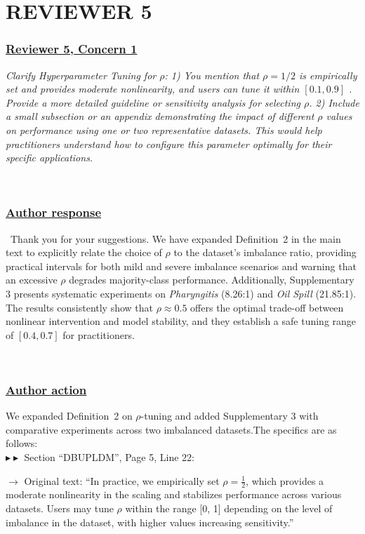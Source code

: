 \documentclass[journal,12pn, onecolumn]{IEEEtran}
\begin{document}
{{{{{{\newpage

{\color{black}
\section*{\textbf{REVIEWER 5}}\label{rev5}}
\textcolor{customgreen}{
\subsubsection*{\underline{\textbf{Reviewer 5, Concern 1}}}
\emph{Clarify Hyperparameter Tuning for $\rho$:
1) You mention that $\rho = 1/2$ is empirically set and provides moderate nonlinearity, and users can tune it within $[0.1, 0.9]$ . Provide a more detailed guideline or sensitivity analysis for selecting $\rho$.
2) Include a small subsection or an appendix demonstrating the impact of different $\rho$ values on performance using one or two representative datasets. This would help practitioners understand how to configure this parameter optimally for their specific applications.
}
}
\\
{\color{black}
\subsubsection*{\textbf{\underline{Author response}}} Thank you for your suggestions. We have expanded Definition~2 in the main text to explicitly relate the choice of $\rho$ to the dataset's imbalance ratio, providing practical intervals for both mild and severe imbalance scenarios and warning that an excessive $\rho$ degrades majority-class performance. 
Additionally, Supplementary 3 presents systematic experiments on \textit{Pharyngitis} (8.26:1) and \textit{Oil Spill} (21.85:1). 
The results consistently show that $\rho\approx0.5$ offers the optimal trade-off between nonlinear intervention and model stability, and they establish a safe tuning range of $[0.4,0.7]$ for practitioners.}\\

{\color{black}
\subsubsection*{\textbf{\underline{Author action}}}We expanded Definition~2 on $\rho$-tuning and added Supplementary 3 with comparative experiments across two imbalanced datasets.The specifics are as follows:
\\

$\blacktriangleright\blacktriangleright$ Section ``DBUPLDM'', Page 5,  Line 22:\\
\par}
{\color{black}$\longrightarrow$ Original text: ``In practice, we empirically set $\rho = \frac{1}{2}$, which provides a moderate nonlinearity in the scaling and stabilizes performance across various datasets. Users may tune $\rho$ within the range [0, 1] depending on the level of imbalance in the dataset, with higher values increasing sensitivity.''}\\

}}}}}}
\end{document}
